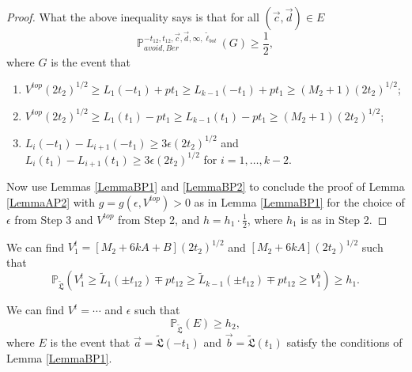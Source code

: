 \begin{proof}
	What the above inequality says is that for all $(\vec{c}, \vec{d}) \in E$
	$$\mathbb{P}_{avoid, Ber}^{-t_{12}, t_{12}, \vec{c}, \vec{d}, \infty, \tilde{\ell}_{bot}} ( G) \geq \frac{1}{2},$$
	where $G$ is the event that
	
	\begin{enumerate}
		\item $V^{top} (2t_2)^{1/2} \geq L_1(-t_1) + p t_1 \geq L_{k-1}(-t_1) + pt_1 \geq (M_2 + 1) (2t_2)^{1/2}$;
		\item $V^{top} (2t_2)^{1/2} \geq L_1(t_1) - p t_1 \geq L_{k-1}(t_1) - pt_1 \geq (M_2 + 1) (2t_2)^{1/2}$; 
		\item $L_i(-t_1) -L_{i+1}(-t_1) \geq 3\epsilon (2t_2)^{1/2}$ and $L_i(t_1) -L_{i+1}(t_1)  \geq 3 \epsilon (2t_2)^{1/2}$ for $i = 1, \dots, k-2$.
	\end{enumerate}
	
	
	Now use Lemmas \ref{LemmaBP1} and \ref{LemmaBP2} to conclude the proof of Lemma \ref{LemmaAP2} with $g = g(\epsilon, V^{top}) > 0$ as in Lemma \ref{LemmaBP1} for the choice of $\epsilon$ from Step 3 and $V^{top}$ from Step 2, and $h = h_1 \cdot \frac{1}{2}$, where $h_1$ is as in Step 2.
\end{proof}

\begin{lemma}\label{LemmaBP2} We can find $V_1^t = [ M_2 + 6k A + B] (2t_2)^{1/2} $ and $[ M_2 + 6k A ] (2t_2)^{1/2} $ such that 
	\begin{equation}\label{eqnRT2}
	\mathbb{P}_{\tilde{\mathfrak{L}}} \left(  V_1^t \geq \tilde{L}_1(\pm t_{12}) \mp p t_{12} \geq \tilde{L}_{k-1}(\pm t_{12}) \mp p t_{12} \geq V_1^b  \right) \geq h_1.
	\end{equation}
\end{lemma}

\begin{lemma}\label{LemmaBP2} We can find $V^t = \cdots $ and $\epsilon$  such that 
	\begin{equation}\label{eqnRT2}
	\mathbb{P}_{\tilde{\mathfrak{L}}} \left(  E  \right) \geq h_2,
	\end{equation}
	where $E$ is the event that $\vec{a} = \tilde{\mathfrak{L}}(-t_1)$ and $\vec{b} = \tilde{\mathfrak{L}}(t_1)$ satisfy the conditions of Lemma \ref{LemmaBP1}.
\end{lemma}
		
	
	
